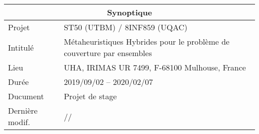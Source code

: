 
\begin{tabularx}{0.9\textwidth}{|l|X|}
	\hline
	\multicolumn{2}{|c|}{\cellcolor{gray!30}Synoptique}\\
	\hline
	Projet & \acrshort{ST50} (\acrshort{UTBM}) / \acrshort{8INF859} (\acrshort{UQAC})\\
	Intitulé & Métaheuristiques Hybrides pour le problème de couverture par ensembles\\
	Lieu & \acrshort{UHA}, \acrshort{IRIMAS} UR 7499, F-68100 Mulhouse, France\\
	Durée & 2019/09/02 -- 2020/02/07\\
	\hline
	Ducument & Projet de stage\\
	Dernière modif. & \the\year/\twodigits\month/\twodigits\day\\
	\hline
\end{tabularx}
